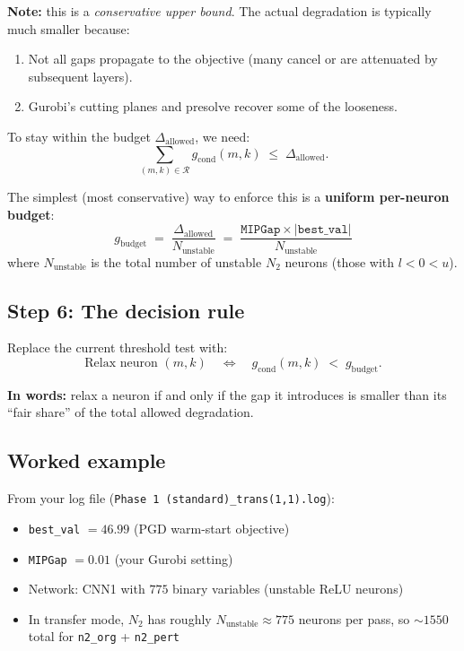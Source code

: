 \documentclass[11pt,a4paper]{article}
\begin{document}
\textbf{Note:} this is a \emph{conservative upper bound}.  The actual
degradation is typically much smaller because:
\begin{enumerate}
  \item Not all gaps propagate to the objective (many cancel or are attenuated
        by subsequent layers).
  \item Gurobi's cutting planes and presolve recover some of the looseness.
\end{enumerate}

To stay within the budget $\Delta_{\mathrm{allowed}}$, we need:
\[
  \sum_{(m,k) \in \mathcal{R}} g_{\mathrm{cond}}(m,k)
  \;\le\;
  \Delta_{\mathrm{allowed}}.
\]

The simplest (most conservative) way to enforce this is a \textbf{uniform
per-neuron budget}:
\begin{equation}\label{eq:perbudget}
  \boxed{\;
    g_{\mathrm{budget}}
    \;=\;
    \frac{\Delta_{\mathrm{allowed}}}{N_{\mathrm{unstable}}}
    \;=\;
    \frac{\texttt{MIPGap} \times |\texttt{best\_val}|}{N_{\mathrm{unstable}}}
  \;}
\end{equation}
where $N_{\mathrm{unstable}}$ is the total number of unstable $N_2$ neurons
(those with $l < 0 < u$).

\subsection{Step 6: The decision rule}\label{sec:m7:rule}

Replace the current threshold test with:
\begin{equation}\label{eq:m7rule}
  \text{Relax neuron $(m,k)$}
  \quad\Longleftrightarrow\quad
  g_{\mathrm{cond}}(m,k) \;<\; g_{\mathrm{budget}}.
\end{equation}

\textbf{In words:} relax a neuron if and only if the gap it introduces is
smaller than its ``fair share'' of the total allowed degradation.

\subsection{Worked example}\label{sec:m7:example}

From your log file (\texttt{Phase 1 (standard)\_trans(1,1).log}):
\begin{itemize}
  \item \texttt{best\_val} $= 46.99$ (PGD warm-start objective)
  \item \texttt{MIPGap} $= 0.01$ (your Gurobi setting)
  \item Network: CNN1 with $775$ binary variables (unstable ReLU neurons)
  \item In transfer mode, $N_2$ has roughly $N_{\mathrm{unstable}} \approx 775$
        neurons per pass, so $\sim 1550$ total for \texttt{n2\_org} +
        \texttt{n2\_pert}
\end{itemize}
\end{document}
